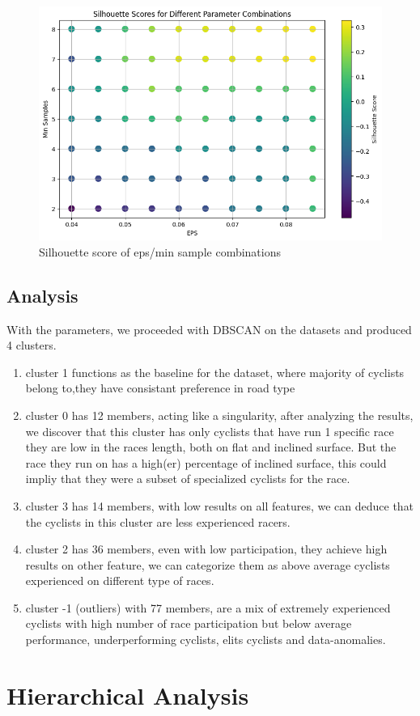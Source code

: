 \documentclass{article}
\begin{document}
\begin{figure}
\centering
\includegraphics[width=0.40\linewidth]{11.png}
\caption{\label{fig:11}Silhouette score of eps/min sample combinations}
\end{figure}

\subsection{Analysis}
With the parameters, we proceeded with DBSCAN on the datasets and produced 4 clusters. 
\begin{enumerate}
    \item cluster 1 functions as the baseline for the dataset, where majority of cyclists belong to,they have consistant preference in road type
    \item cluster 0 has 12 members, acting like a singularity, after analyzing the results, we discover that this cluster has only cyclists that have run 1 specific race they are low in the races length, both on flat and inclined surface. But the race they run on has a high(er) percentage of inclined surface, this could impliy that they were a subset of specialized cyclists for the race.
    \item cluster 3 has 14 members, with low results on all features, we can deduce that the cyclists in this cluster are less experienced racers.
    \item cluster 2 has 36 members, even with low participation, they achieve high results on other feature, we can categorize them as above average cyclists experienced on different type of races.
    \item cluster -1 (outliers)  with 77 members, are a mix of extremely experienced cyclists with high number of race participation but below average performance, underperforming cyclists, elits cyclists and data-anomalies.
\end{enumerate}






\section{Hierarchical Analysis}
\end{document}

